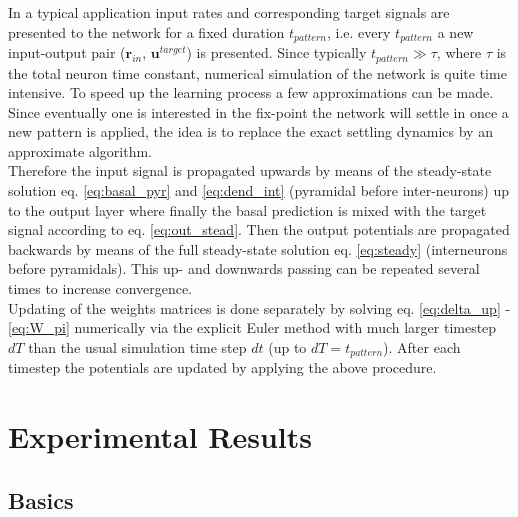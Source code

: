 \documentclass[12pt,a4paper]{article}
\begin{document}
In a typical application input rates and corresponding target signals are presented to the network for a fixed duration $t_{pattern}$, i.e. every $t_{pattern}$ a new input-output pair ($\bm{r}_{in}$, $\bm{u}^{target}$) is presented. Since typically $t_{pattern}\gg\tau$, where $\tau$ is the total neuron time constant, numerical simulation of the network is quite time intensive. To speed up the learning process a few approximations can be made. Since eventually one is interested in the fix-point the network will settle in once a new pattern is applied, the idea is to replace the exact settling dynamics by an approximate algorithm.\\
Therefore the input signal is propagated upwards by means of the steady-state solution eq. \eqref{eq:basal_pyr} and \eqref{eq:dend_int} (pyramidal before inter-neurons) up to the output layer where finally the basal prediction is mixed with the target signal according to eq. \eqref{eq:out_stead}. Then the output potentials are propagated backwards by means of the full steady-state solution eq. \eqref{eq:steady} (interneurons before pyramidals). This up- and downwards passing can be repeated several times to increase convergence. \\
Updating of the weights matrices is done separately by solving eq. \eqref{eq:delta_up} - \eqref{eq:W_pi} numerically via the explicit Euler method with much larger timestep $dT$ than the usual simulation time step $dt$ (up to $dT=t_{pattern}$). After each timestep the potentials are updated by applying the above procedure. 


\section{Experimental Results}

\subsection{Basics}
\end{document}
